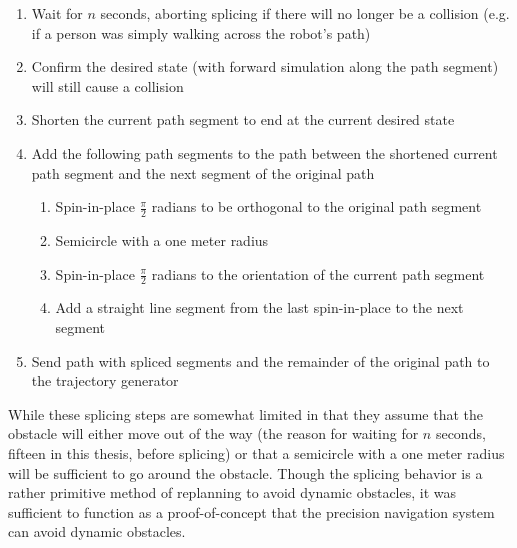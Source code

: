 \begin{enumerate}
\item Wait for $n$ seconds, aborting splicing if there will no longer be a collision (e.g. if a person was simply walking across the robot's path)
\item Confirm the desired state (with forward simulation along the path segment) will still cause a collision
\item Shorten the current path segment to end at the current desired state
\item Add the following path segments to the path between the shortened current path segment and the next segment of the original path
	\begin{enumerate}
	\item Spin-in-place $\frac{\pi}{2}$ radians to be orthogonal to the original path segment
	\item Semicircle with a one meter radius
	\item Spin-in-place $\frac{\pi}{2}$ radians to the orientation of the current path segment
	\item Add a straight line segment from the last spin-in-place to the next segment
	\end{enumerate}
\item Send path with spliced segments and the remainder of the original path to the trajectory generator
\end{enumerate}

While these splicing steps are somewhat limited in that they assume that the obstacle will either move out of the way (the reason for waiting for $n$ seconds, fifteen in this thesis, before splicing) or that a semicircle with a one meter radius will be sufficient to go around the obstacle. Though the splicing behavior is a rather primitive method of replanning to avoid dynamic obstacles, it was sufficient to function as a proof-of-concept that the precision navigation system can avoid dynamic obstacles.

